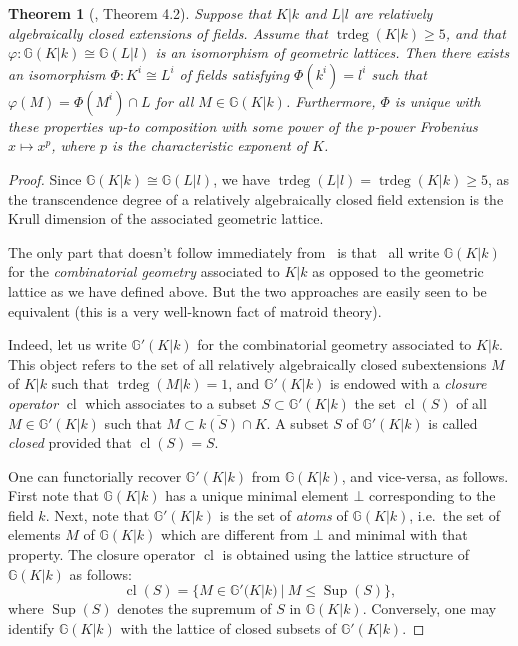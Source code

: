 \documentclass[12pt]{amsart}
\newcommand{\cl}{\operatorname{cl}}
\newcommand{\Sup}{\operatorname{Sup}}
\newcommand{\Gbb}{\mathbb{G}}
\newcommand{\trdeg}{\operatorname{trdeg}}
\renewcommand{\bar}{\overline}
\renewcommand{\phi}{\varphi}
\newtheorem{theorem}{Theorem}[section]
\theoremstyle{definition}
\begin{document}
\begin{theorem}[\cite{zbMATH05350217}, Theorem 4.2]\label{theorem:Evans-Hrushovski-Gismatullin}
  Suppose that $K|k$ and $L|l$ are relatively algebraically closed extensions of fields.
  Assume that $\trdeg(K|k) \geq 5$, and that $\phi : \Gbb(K|k) \cong \Gbb(L|l)$ is an isomorphism of geometric lattices.
  Then there exists an isomorphism $\Phi : K^{i} \cong L^{i}$ of fields satisfying $\Phi(k^{i}) = l^{i}$ such that $\phi(M) = \Phi(M^{i}) \cap L$ for all $M \in \Gbb(K|k)$.
  Furthermore, $\Phi$ is unique with these properties up-to composition with some power of the $p$-power Frobenius $x \mapsto x^{p}$, where $p$ is the characteristic exponent of $K$.
\end{theorem}
\begin{proof}
  Since $\Gbb(K|k) \cong \Gbb(L|l)$, we have $\trdeg(L|l) = \trdeg(K|k) \geq 5$, as the transcendence degree of a relatively algebraically closed field extension is the Krull dimension of the associated geometric lattice.

  The only part that doesn't follow immediately from~\cite[Theorem 4.2]{zbMATH05350217} is that~\cite{zbMATH00007333,zbMATH00839199,zbMATH05350217} all write $\Gbb(K|k)$ for the \emph{combinatorial geometry} associated to $K|k$ as opposed to the geometric lattice as we have defined above.
  But the two approaches are easily seen to be equivalent (this is a very well-known fact of matroid theory).

  Indeed, let us write $\Gbb'(K|k)$ for the combinatorial geometry associated to $K|k$.
  This object refers to the set of all relatively algebraically closed subextensions $M$ of $K|k$ such that $\trdeg(M|k) = 1$, and $\Gbb'(K|k)$ is endowed with a \emph{closure operator} $\cl$ which associates to a subset $S \subset \Gbb'(K|k)$ the set $\cl(S)$ of all $M \in \Gbb'(K|k)$ such that $M \subset \bar{k(S)} \cap K$.
  A subset $S$ of $\Gbb'(K|k)$ is called \emph{closed} provided that $\cl(S) = S$.

  One can functorially recover $\Gbb'(K|k)$ from $\Gbb(K|k)$, and vice-versa, as follows.
  First note that $\Gbb(K|k)$ has a unique minimal element $\bot$ corresponding to the field $k$.
  Next, note that $\Gbb'(K|k)$ is the set of \emph{atoms} of $\Gbb(K|k)$, i.e.~the set of elements $M$ of $\Gbb(K|k)$ which are different from $\bot$ and minimal with that property.
  The closure operator $\cl$ is obtained using the lattice structure of $\Gbb(K|k)$ as follows:
  \[ \cl(S) = \{M \in \Gbb'(K|k) \ | \ M \le \Sup(S) \}, \]
  where $\Sup(S)$ denotes the supremum of $S$ in $\Gbb(K|k)$.
  Conversely, one may identify $\Gbb(K|k)$ with the lattice of closed subsets of $\Gbb'(K|k)$.


\end{proof}
\end{document}
